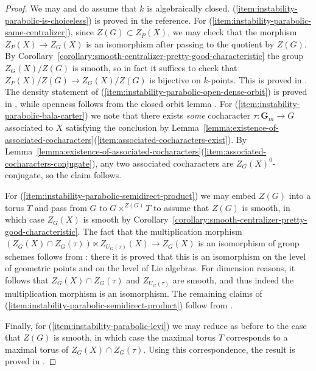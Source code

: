\documentclass[11pt,reqno]{amsart}
\theoremstyle{definition}
\newcommand{\bG}{{\mathbf G}}
\begin{document}
\begin{proof}
We may and do assume that $k$ is algebraically closed. (\ref{item:instability-parabolic-is-choiceless}) is proved in the reference. For (\ref{item:instability-parabolic-same-centralizer}), since $Z(G) \subset Z_P(X)$, we may check that the morphism $Z_P(X) \to Z_G(X)$ is an isomorphism after passing to the quotient by $Z(G)$. By Corollary~\ref{corollary:smooth-centralizer-pretty-good-characteristic} the group $Z_G(X)/Z(G)$ is smooth, so in fact it suffices to check that $Z_P(X)/Z(G) \to Z_G(X)/Z(G)$ is bijective on $k$-points. This is proved in \cite[5.9]{Jantzen-nilpotent}. The density statement of (\ref{item:instability-parabolic-open-dense-orbit}) is proved in \cite[5.9]{Jantzen-nilpotent}, while openness follows from the closed orbit lemma \cite[1.8, Prop.]{Borel}. For (\ref{item:instability-parabolic-bala-carter}) we note that there exists \textit{some} cocharacter $\tau: \bG_m \to G$ associated to $X$ satisfying the conclusion by Lemma~\ref{lemma:existence-of-associated-cocharacters}(\ref{item:associated-cocharacters-exist}). By Lemma~\ref{lemma:existence-of-associated-cocharacters}(\ref{item:associated-cocharacters-conjugate}), any two associated cocharacters are $Z_G(X)^0$-conjugate, so the claim follows. \smallskip

For (\ref{item:instability-parabolic-semidirect-product}) we may embed $Z(G)$ into a torus $T$ and pass from $G$ to $G \times^{Z(G)} T$ to assume that $Z(G)$ is smooth, in which case $Z_G(X)$ is smooth by Corollary~\ref{corollary:smooth-centralizer-pretty-good-characteristic}. The fact that the multiplication morphism $(Z_G(X) \cap Z_G(\tau)) \ltimes Z_{U_G(\tau)}(X) \to Z_G(X)$ is an isomorphism of group schemes follows from \cite[5.10]{Jantzen-nilpotent}: there it is proved that this is an isomorphism on the level of geometric points and on the level of Lie algebras. For dimension reasons, it follows that $Z_G(X) \cap Z_G(\tau)$ and $Z_{U_G(\tau)}$ are smooth, and thus indeed the multiplication morphism is an isomorphism. The remaining claims of (\ref{item:instability-parabolic-semidirect-product}) follow from \cite[5.10-11]{Jantzen-nilpotent}. \smallskip

Finally, for (\ref{item:instability-parabolic-levi}) we may reduce as before to the case that $Z(G)$ is smooth, in which case the maximal torus $T$ corresponds to a maximal torus of $Z_G(X) \cap Z_G(\tau)$. Using this correspondence, the result is proved in \cite[Prop.\ 16]{McNinch-nilpotent-orbits}.
\end{proof}
\end{document}
